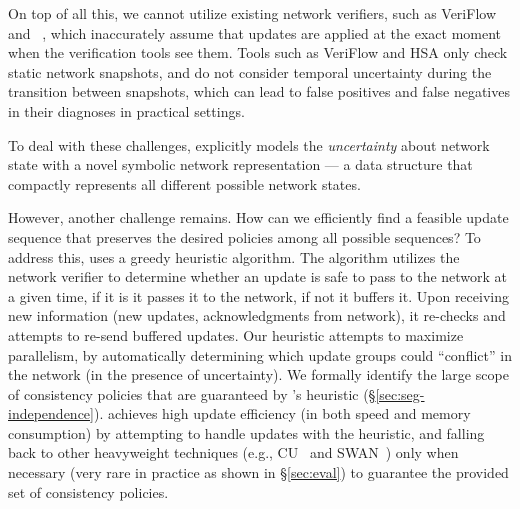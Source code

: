 On top of all this, we
cannot utilize existing network verifiers, such as VeriFlow~\cite{VeriFlow} and~\cite{PHA2012}
, which inaccurately assume 
that updates are applied
at the exact moment when the verification tools see them.
Tools such as VeriFlow and HSA only check
static network snapshots, and do not consider temporal uncertainty
during the transition between snapshots, which can lead to false
positives and false negatives in their diagnoses in practical
settings.

To deal with these challenges,
\name explicitly models the {\em uncertainty} about network state 
with a novel symbolic network representation --- a data structure that compactly represents all different possible network states. 

However, another challenge remains. How can we efficiently find a feasible update sequence that preserves
the desired policies among all possible sequences?
To address this, \name uses a greedy heuristic algorithm.
The algorithm utilizes the network verifier to determine whether an update is safe to pass to the network at a given time, if it is it passes it to the network, if not it buffers it.
Upon receiving new information (new updates, acknowledgments from network), it re-checks and attempts to re-send buffered updates.
Our heuristic attempts to maximize parallelism, by automatically determining which update groups could ``conflict'' in the network (in the presence of uncertainty). 
We formally identify the large scope of consistency policies that are guaranteed by \name's heuristic (\S\ref{sec:seg-independence}). \name achieves high update efficiency (in both speed and memory consumption) by attempting to handle updates with the heuristic, and falling back to other heavyweight techniques (e.g., CU~\cite{Reitblatt2012} and SWAN~\cite{Hong13}) only when necessary (very rare in practice as shown in \S\ref{sec:eval}) to guarantee the provided
set of consistency policies. 

